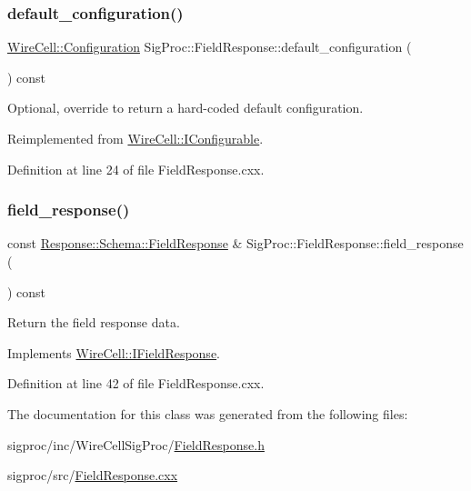 \subsubsection{\texorpdfstring{default\+\_\+configuration()}{default\_configuration()}}
{\footnotesize\ttfamily \hyperlink{namespace_wire_cell_a9f705541fc1d46c608b3d32c182333ee}{Wire\+Cell\+::\+Configuration} Sig\+Proc\+::\+Field\+Response\+::default\+\_\+configuration (\begin{DoxyParamCaption}{ }\end{DoxyParamCaption}) const\hspace{0.3cm}{\ttfamily [virtual]}}



Optional, override to return a hard-\/coded default configuration. 



Reimplemented from \hyperlink{class_wire_cell_1_1_i_configurable_a54841b2da3d1ea02189478bff96f7998}{Wire\+Cell\+::\+I\+Configurable}.



Definition at line 24 of file Field\+Response.\+cxx.

\mbox{\label{class_wire_cell_1_1_sig_proc_1_1_field_response_a417bd4fb3bbcae69c78ae5db0ae40f41}} 
\subsubsection{\texorpdfstring{field\+\_\+response()}{field\_response()}}
{\footnotesize\ttfamily const \hyperlink{struct_wire_cell_1_1_response_1_1_schema_1_1_field_response}{Response\+::\+Schema\+::\+Field\+Response} \& Sig\+Proc\+::\+Field\+Response\+::field\+\_\+response (\begin{DoxyParamCaption}{ }\end{DoxyParamCaption}) const\hspace{0.3cm}{\ttfamily [virtual]}}



Return the field response data. 



Implements \hyperlink{class_wire_cell_1_1_i_field_response_a367f57c6ea973d7aa51022f6e3640256}{Wire\+Cell\+::\+I\+Field\+Response}.



Definition at line 42 of file Field\+Response.\+cxx.



The documentation for this class was generated from the following files\+:\begin{DoxyCompactItemize}
\item 
sigproc/inc/\+Wire\+Cell\+Sig\+Proc/\hyperlink{_field_response_8h}{Field\+Response.\+h}\item 
sigproc/src/\hyperlink{_field_response_8cxx}{Field\+Response.\+cxx}\end{DoxyCompactItemize}
